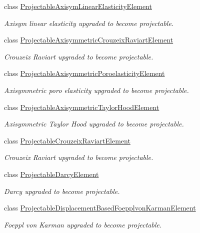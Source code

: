 \begin{DoxyCompactItemize}
class \hyperlink{classoomph_1_1ProjectableAxisymLinearElasticityElement}{Projectable\+Axisym\+Linear\+Elasticity\+Element}
\begin{DoxyCompactList}\small\item\em Axisym linear elasticity upgraded to become projectable. \end{DoxyCompactList}\item 
class \hyperlink{classoomph_1_1ProjectableAxisymmetricCrouzeixRaviartElement}{Projectable\+Axisymmetric\+Crouzeix\+Raviart\+Element}
\begin{DoxyCompactList}\small\item\em Crouzeix Raviart upgraded to become projectable. \end{DoxyCompactList}\item 
class \hyperlink{classoomph_1_1ProjectableAxisymmetricPoroelasticityElement}{Projectable\+Axisymmetric\+Poroelasticity\+Element}
\begin{DoxyCompactList}\small\item\em Axisymmetric poro elasticity upgraded to become projectable. \end{DoxyCompactList}\item 
class \hyperlink{classoomph_1_1ProjectableAxisymmetricTaylorHoodElement}{Projectable\+Axisymmetric\+Taylor\+Hood\+Element}
\begin{DoxyCompactList}\small\item\em Axisymmetric Taylor Hood upgraded to become projectable. \end{DoxyCompactList}\item 
class \hyperlink{classoomph_1_1ProjectableCrouzeixRaviartElement}{Projectable\+Crouzeix\+Raviart\+Element}
\begin{DoxyCompactList}\small\item\em Crouzeix Raviart upgraded to become projectable. \end{DoxyCompactList}\item 
class \hyperlink{classoomph_1_1ProjectableDarcyElement}{Projectable\+Darcy\+Element}
\begin{DoxyCompactList}\small\item\em Darcy upgraded to become projectable. \end{DoxyCompactList}\item 
class \hyperlink{classoomph_1_1ProjectableDisplacementBasedFoepplvonKarmanElement}{Projectable\+Displacement\+Based\+Foepplvon\+Karman\+Element}
\begin{DoxyCompactList}\small\item\em Foeppl von Karman upgraded to become projectable. \end{DoxyCompactList}\item 

\end{DoxyCompactItemize}
